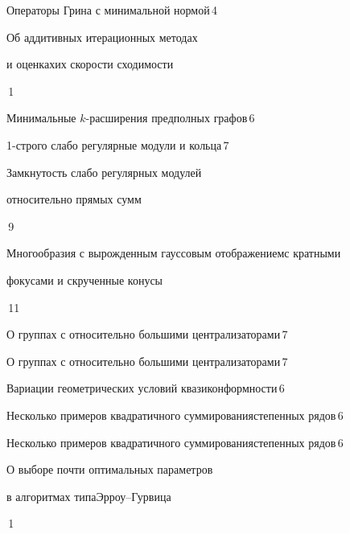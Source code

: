 

{Операторы Грина с минимальной нормой}{\No\,4}




{Об аддитивных итерационных методах


и оценках\newline их скорости сходимости}{\No\,1}




{Минимальные $k$-расширения предполных графов}{\No\,6}




{1-строго слабо регулярные модули и кольца}{\No\,7}




{Замкнутость слабо регулярных модулей  


относительно прямых сумм}{\No\,9}




{Многообразия с вырожденным гауссовым отображением\newline с кратными


фокусами и скрученные конусы}{\No\,11}




{О группах с относительно большими централизаторами}{\No\,7}




{О группах с относительно большими централизаторами}{\No\,7}




{Вариации геометрических условий квазиконформности}{\No\,6}




{Несколько примеров квадратичного суммирования\newline степенных рядов}{\No\,6}




{Несколько примеров квадратичного суммирования\newline степенных рядов}{\No\,6}




{О выборе почти оптимальных параметров


в алгоритмах типа\newline Эрроу--Гурвица}{\No\,1}




